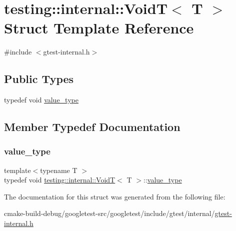 \hypertarget{structtesting_1_1internal_1_1VoidT}{}\section{testing\+::internal\+::VoidT$<$ T $>$ Struct Template Reference}
\label{structtesting_1_1internal_1_1VoidT}


{\ttfamily \#include $<$gtest-\/internal.\+h$>$}

\subsection*{Public Types}
\begin{DoxyCompactItemize}
\item 
typedef void \mbox{\hyperlink{structtesting_1_1internal_1_1VoidT_a29e6a3f3989ddb47103944b350f1bec0}{value\+\_\+type}}
\end{DoxyCompactItemize}


\subsection{Member Typedef Documentation}
\mbox{\label{structtesting_1_1internal_1_1VoidT_a29e6a3f3989ddb47103944b350f1bec0}} 
\subsubsection{\texorpdfstring{value\_type}{value\_type}}
{\footnotesize\ttfamily template$<$typename T $>$ \\
typedef void \mbox{\hyperlink{structtesting_1_1internal_1_1VoidT}{testing\+::internal\+::\+VoidT}}$<$ T $>$\+::\mbox{\hyperlink{structtesting_1_1internal_1_1VoidT_a29e6a3f3989ddb47103944b350f1bec0}{value\+\_\+type}}}



The documentation for this struct was generated from the following file\+:\begin{DoxyCompactItemize}
\item 
cmake-\/build-\/debug/googletest-\/src/googletest/include/gtest/internal/\mbox{\hyperlink{gtest-internal_8h}{gtest-\/internal.\+h}}\end{DoxyCompactItemize}
